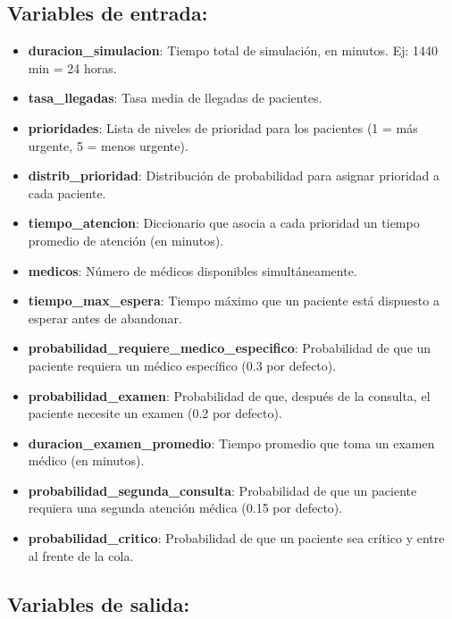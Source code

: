 \documentclass[12pt]{article}
\begin{document}
\subsection{Variables de entrada:}
\begin{itemize}
  \item \textbf{duracion\_simulacion}: Tiempo total de simulación, en minutos. Ej: 1440 min = 24 horas.
  \item \textbf{tasa\_llegadas}: Tasa media de llegadas de pacientes.
  \item \textbf{prioridades}: Lista de niveles de prioridad para los pacientes (1 = más urgente, 5 = menos urgente).
  \item \textbf{distrib\_prioridad}: Distribución de probabilidad para asignar prioridad a cada paciente.
  \item \textbf{tiempo\_atencion}: Diccionario que asocia a cada prioridad un tiempo promedio de atención (en minutos).
  \item \textbf{medicos}: Número de médicos disponibles simultáneamente.
  \item \textbf{tiempo\_max\_espera}: Tiempo máximo que un paciente está dispuesto a esperar antes de abandonar.
  \item \textbf{probabilidad\_requiere\_medico\_especifico}: Probabilidad de que un paciente requiera un médico específico (0.3 por defecto).
  \item \textbf{probabilidad\_examen}: Probabilidad de que, después de la consulta, el paciente necesite un examen (0.2 por defecto).
  \item \textbf{duracion\_examen\_promedio}: Tiempo promedio que toma un examen médico (en minutos).
  \item \textbf{probabilidad\_segunda\_consulta}: Probabilidad de que un paciente requiera una segunda atención médica (0.15 por defecto).
  \item \textbf{probabilidad\_critico}: Probabilidad de que un paciente sea crítico y entre al frente de la cola.
\end{itemize}

\subsection{Variables de salida:}
\end{document}
